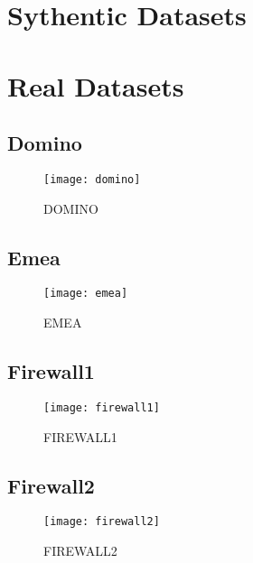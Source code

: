 \newpage
\section{Sythentic Datasets}
\label{sec:A_syn_datasets}

\section{Real Datasets}
\label{sec:A_real_datasets}
	\subsection{Domino}
		\begin{figure}[H]
			\centering
			\texttt{[image: domino]}
			\caption{DOMINO}
			\label{fig:domino}
		\end{figure}
	\subsection{Emea}
		\begin{figure}[H]
			\centering
			\texttt{[image: emea]}
			\caption{EMEA}
			\label{fig:emea}
		\end{figure}
	\subsection{Firewall1}
		\begin{figure}[H]
			\centering
			\texttt{[image: firewall1]}
			\caption{FIREWALL1}
			\label{fig:firewall1}
		\end{figure}
	\subsection{Firewall2}
		\begin{figure}[H]
			\centering
			\texttt{[image: firewall2]}
			\caption{FIREWALL2}
			\label{fig:firewall2}
		\end{figure}